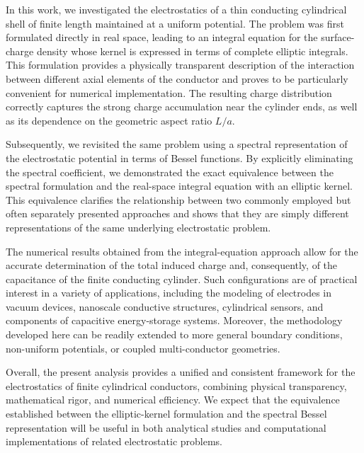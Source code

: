 \documentclass[12pt]{article}
\begin{document}
In this work, we investigated the electrostatics of a thin conducting
cylindrical shell of finite length maintained at a uniform potential. The
problem was first formulated directly in real space, leading to an integral
equation for the surface-charge density whose kernel is expressed in terms of
complete elliptic integrals. This formulation provides a physically
transparent description of the interaction between different axial elements of
the conductor and proves to be particularly convenient for numerical
implementation. The resulting charge distribution correctly captures the
strong charge accumulation near the cylinder ends, as well as its dependence
on the geometric aspect ratio $L/a$.

Subsequently, we revisited the same problem using a spectral representation of
the electrostatic potential in terms of Bessel functions. By explicitly
eliminating the spectral coefficient, we demonstrated the exact equivalence
between the spectral formulation and the real-space integral equation with an
elliptic kernel. This equivalence clarifies the relationship between two
commonly employed but often separately presented approaches and shows that
they are simply different representations of the same underlying electrostatic problem.

The numerical results obtained from the integral-equation approach allow for
the accurate determination of the total induced charge and, consequently, of
the capacitance of the finite conducting cylinder. Such configurations are of
practical interest in a variety of applications, including the modeling of
electrodes in vacuum devices, nanoscale conductive structures, cylindrical
sensors, and components of capacitive energy-storage systems. Moreover, the
methodology developed here can be readily extended to more general boundary
conditions, non-uniform potentials, or coupled multi-conductor geometries.

Overall, the present analysis provides a unified and consistent framework for
the electrostatics of finite cylindrical conductors, combining physical
transparency, mathematical rigor, and numerical efficiency. We expect that the
equivalence established between the elliptic-kernel formulation and the
spectral Bessel representation will be useful in both analytical studies and
computational implementations of related electrostatic problems.
\end{document}
